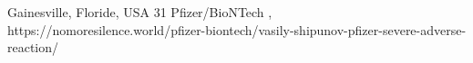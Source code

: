           {Gainesville, Floride, USA}
          {31}
          {Pfizer/BioNTech}
          {}
          {
            ,
          }
          {https://nomoresilence.world/pfizer-biontech/vasily-shipunov-pfizer-severe-adverse-reaction/}


